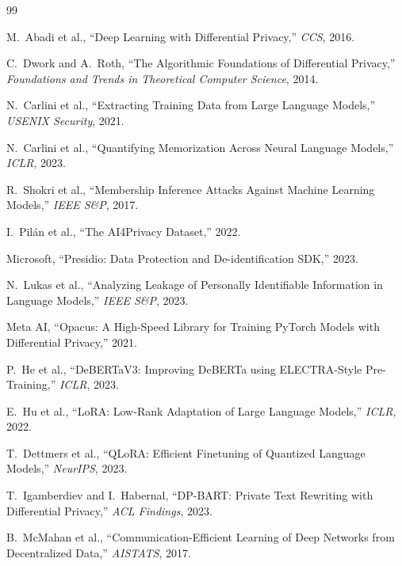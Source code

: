 \documentclass[11pt, a4paper]{article}
\begin{document}
\newpage
\begin{thebibliography}{99}

M.~Abadi et al., ``Deep Learning with Differential Privacy,''
\textit{CCS}, 2016.

C.~Dwork and A.~Roth, ``The Algorithmic Foundations of Differential
Privacy,'' \textit{Foundations and Trends in Theoretical Computer
Science}, 2014.

N.~Carlini et al., ``Extracting Training Data from Large Language
Models,'' \textit{USENIX Security}, 2021.

N.~Carlini et al., ``Quantifying Memorization Across Neural Language
Models,'' \textit{ICLR}, 2023.

R.~Shokri et al., ``Membership Inference Attacks Against Machine
Learning Models,'' \textit{IEEE S\&P}, 2017.

I.~Pil\'{a}n et al., ``The AI4Privacy Dataset,'' 2022.

Microsoft, ``Presidio: Data Protection and De-identification SDK,''
2023.

N.~Lukas et al., ``Analyzing Leakage of Personally Identifiable
Information in Language Models,'' \textit{IEEE S\&P}, 2023.

Meta AI, ``Opacus: A High-Speed Library for Training PyTorch Models
with Differential Privacy,'' 2021.

P.~He et al., ``DeBERTaV3: Improving DeBERTa using ELECTRA-Style
Pre-Training,'' \textit{ICLR}, 2023.

E.~Hu et al., ``LoRA: Low-Rank Adaptation of Large Language Models,''
\textit{ICLR}, 2022.

T.~Dettmers et al., ``QLoRA: Efficient Finetuning of Quantized Language
Models,'' \textit{NeurIPS}, 2023.

T.~Igamberdiev and I.~Habernal, ``DP-BART: Private Text Rewriting with
Differential Privacy,'' \textit{ACL Findings}, 2023.

B.~McMahan et al., ``Communication-Efficient Learning of Deep Networks
from Decentralized Data,'' \textit{AISTATS}, 2017.


\end{thebibliography}
\end{document}
